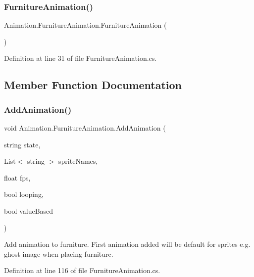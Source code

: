 \subsubsection{\texorpdfstring{Furniture\+Animation()}{FurnitureAnimation()}}
{\footnotesize\ttfamily Animation.\+Furniture\+Animation.\+Furniture\+Animation (\begin{DoxyParamCaption}{ }\end{DoxyParamCaption})}



Definition at line 31 of file Furniture\+Animation.\+cs.



\subsection{Member Function Documentation}
\mbox{\label{class_animation_1_1_furniture_animation_ac1d271b268d374119c337ccc2ef3b5a3}} 
\subsubsection{\texorpdfstring{Add\+Animation()}{AddAnimation()}}
{\footnotesize\ttfamily void Animation.\+Furniture\+Animation.\+Add\+Animation (\begin{DoxyParamCaption}\item[{string}]{state,  }\item[{List$<$ string $>$}]{sprite\+Names,  }\item[{float}]{fps,  }\item[{bool}]{looping,  }\item[{bool}]{value\+Based }\end{DoxyParamCaption})}



Add animation to furniture. First animation added will be default for sprites e.\+g. ghost image when placing furniture. 



Definition at line 116 of file Furniture\+Animation.\+cs.

\mbox{\label{class_animation_1_1_furniture_animation_a18c59f6b23e55576c2681476914eb4e7}} 
